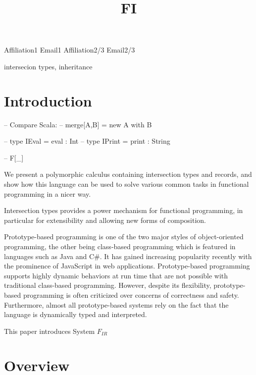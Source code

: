 \documentclass[preprint]{sigplanconf}
\newcommand{\FI}{{\bf FI} }
\begin{document}
\setlength{\pdfpageheight}{\paperheight}
\setlength{\pdfpagewidth}{\paperwidth}

\title{\FI}

           {Affiliation1}
           {Email1}
           {Affiliation2/3}
           {Email2/3}

\maketitle

\begin{abstract}
\end{abstract}

\keywords
intersecion types, inheritance

\section{Introduction}

-- Compare Scala:
-- merge[A,B] = new A with B

-- type IEval  = { eval :  Int }
-- type IPrint = { print : String }

-- F[\_]

We present a polymorphic calculus containing intersection types and records, and show
how this language can be used to solve various common tasks in functional
programming in a nicer way.

Intersection types provides a power mechanism for functional programming, in
particular for extensibility and allowing new forms of composition.

Prototype-based programming is one of the two major styles of object-oriented
programming, the other being class-based programming which is featured in
languages such as Java and C\#. It has gained increasing popularity recently
with the prominence of JavaScript in web applications. Prototype-based
programming supports highly dynamic behaviors at run time that are not possible
with traditional class-based programming. However, despite its flexibility,
prototype-based programming is often criticized over concerns of correctness and
safety. Furthermore, almost all prototype-based systems rely on the fact that
the language is dynamically typed and interpreted.

This paper introduces System $F_{IR}$

\section{Overview}
\end{document}

